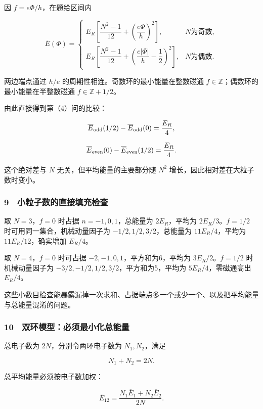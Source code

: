 \documentclass[12pt,a4paper,fontset=fandol]{ctexart}
\begin{document}
因 \(f=e\Phi/h\)，在题给区间内

\[\overline E(\Phi)=
\begin{cases}
E_R\left[\dfrac{N^2-1}{12}+\left(\dfrac{e\Phi}{h}\right)^2\right],&N\text{为奇数},\\[5pt]
E_R\left[\dfrac{N^2-1}{12}+\left(\dfrac{e|\Phi|}{h}-\dfrac12\right)^2\right],&N\text{为偶数}.
\end{cases}\]

两边端点通过 \(h/e\) 的周期性相连。奇数环的最小能量在整数磁通
\(f\in\mathbb Z\)；偶数环的最小能量在半整数磁通 \(f\in\mathbb Z+1/2\)。

由此直接得到第（4）问的比较：

\[\overline E_{\rm odd}(1/2)-\overline E_{\rm odd}(0)=\frac{E_R}{4},\]

\[\overline E_{\rm even}(0)-\overline E_{\rm even}(1/2)=\frac{E_R}{4}.\]

这个绝对差与 \(N\) 无关，但平均能量的主要部分随 \(N^2\)
增长，因此相对差在大粒子数时变小。

\subsubsection{9　小粒子数的直接填充检查}\label{ux5c0fux7c92ux5b50ux6570ux7684ux76f4ux63a5ux586bux5145ux68c0ux67e5}

取 \(N=3\)，\(f=0\) 时占据 \(n=-1,0,1\)，总能量为 \(2E_R\)，平均为
\(2E_R/3\)。\(f=1/2\) 时可用同一集合，机械动量因子为
\(-1/2,1/2,3/2\)，总能量为 \(11E_R/4\)，平均为 \(11E_R/12\)，确实增加
\(E_R/4\)。

取 \(N=4\)，\(f=0\) 时可占据 \(-2,-1,0,1\)，平方和为6，平均为
\(3E_R/2\)。\(f=1/2\) 时机械动量因子为
\(-3/2,-1/2,1/2,3/2\)，平方和为5，平均为 \(5E_R/4\)，零磁通高出
\(E_R/4\)。

这些小数目检查能暴露漏掉一次求和、占据端点多一个或少一个、以及把平均能量与总能量混淆的问题。

\subsubsection{10　双环模型：必须最小化总能量}\label{ux53ccux73afux6a21ux578bux5fc5ux987bux6700ux5c0fux5316ux603bux80fdux91cf}

总电子数为 \(2N\)，分别令两环电子数为 \(N_1,N_2\)，满足

\[N_1+N_2=2N.\]

总平均能量必须按电子数加权：

\[\boxed{\overline E_{12}
=\frac{N_1\overline E_1+N_2\overline E_2}{2N}.}\]
\end{document}
